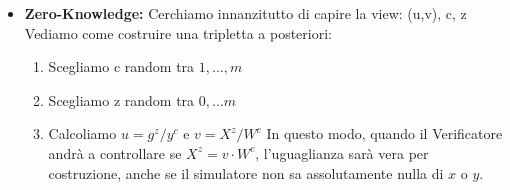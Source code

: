 \begin{itemize}
    Tuttavia, l'attaccante deve inviare $u$ e $v$ (e quindi fissare $\alpha$ e $\beta$) al passo 1, prima che il Verifier scelga $c$ al passo 2. Poiché $c$ è scelto uniformemente a caso tra $m$ valori possibili, la probabilità che l'attaccante abbia scelto i valori di impegno corretti per "indovinare" l'unica sfida possibile è esattamente:
    \[Pr[\text{Successo dell'attaccante}] = \frac{1}{m}\]
    Dato che $m$ è un numero estremamente grande, questa probabilità è trascurabile, garantendo così la proprietà di Soundness.
    \item \textbf{Zero-Knowledge:} Cerchiamo innanzitutto di capire la view: (u,v), c, z 
    Vediamo come costruire una tripletta a posteriori:
    \begin{enumerate}
        \item Scegliamo c random tra $1, ..., m$
        \item Scegliamo z random tra $0, ... m$
        \item Calcoliamo $u = g^z/ y^c$ e $v = X^z/W^c$ In questo modo, quando il Verificatore andrà a controllare se $X^z = v \cdot W^c$, l'uguaglianza sarà vera per costruzione, anche se il simulatore non sa assolutamente nulla di $x$ o $y$.
    \end{enumerate}
\end{itemize}
